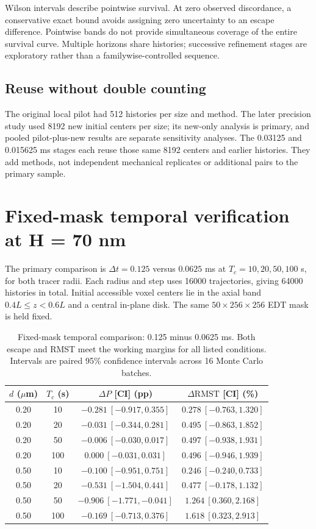 \documentclass[a4paper,10pt]{article}
\numberwithin{equation}{section}
\begin{document}
Wilson intervals describe pointwise survival. At zero observed discordance, a conservative exact bound avoids assigning zero uncertainty to an escape difference. Pointwise bands do not provide simultaneous coverage of the entire survival curve. Multiple horizons share histories; successive refinement stages are exploratory rather than a familywise-controlled sequence.

\subsection*{Reuse without double counting}
The original local pilot had 512 histories per size and method. The later precision study used 8192 new initial centers per size; its new-only analysis is primary, and pooled pilot-plus-new results are separate sensitivity analyses. The 0.03125 and 0.015625 ms stages each reuse those same 8192 centers and earlier histories. They add methods, not independent mechanical replicates or additional pairs to the primary sample.

\clearpage
\section{Fixed-mask temporal verification at H = 70 nm}
The primary comparison is $\Delta t=0.125$ versus $0.0625$ ms at $T_c=10,20,50,100$ s, for both tracer radii. Each radius and step uses 16000 trajectories, giving 64000 histories in total. Initial accessible voxel centers lie in the axial band $0.4L\le z<0.6L$ and a central in-plane disk. The same $50\times256\times256$ EDT mask is held fixed.

\begin{table}[!htbp]
\centering\small
\setlength{\tabcolsep}{4pt}
\caption{Fixed-mask temporal comparison: 0.125 minus 0.0625 ms. Both escape and RMST meet the working margins for all listed conditions. Intervals are paired 95\% confidence intervals across 16 Monte Carlo batches.}\label{tab:h70}
\begin{tabular}{@{}cccc@{}}
\toprule
$d$ ($\mu$m) & $T_c$ (s) & $\Delta P$ [CI] (pp) & $\Delta\mathrm{RMST}$ [CI] (\%) \\ \midrule
0.20 & 10 & $-0.281\ [-0.917,0.355]$ & $0.278\ [-0.763,1.320]$ \\
0.20 & 20 & $-0.031\ [-0.344,0.281]$ & $0.495\ [-0.863,1.852]$ \\
0.20 & 50 & $-0.006\ [-0.030,0.017]$ & $0.497\ [-0.938,1.931]$ \\
0.20 & 100 & $0.000\ [-0.031,0.031]$ & $0.496\ [-0.946,1.939]$ \\
0.50 & 10 & $-0.100\ [-0.951,0.751]$ & $0.246\ [-0.240,0.733]$ \\
0.50 & 20 & $-0.531\ [-1.504,0.441]$ & $0.477\ [-0.178,1.132]$ \\
0.50 & 50 & $-0.906\ [-1.771,-0.041]$ & $1.264\ [0.360,2.168]$ \\
0.50 & 100 & $-0.169\ [-0.713,0.376]$ & $1.618\ [0.323,2.913]$ \\
\bottomrule
\end{tabular}
\end{table}
\end{document}
